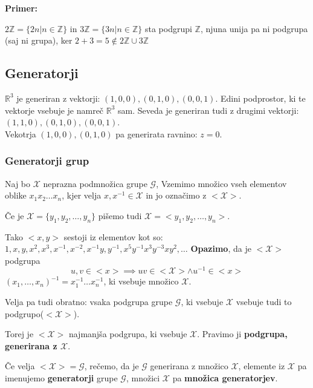 \documentclass[a4paper]{article}
\newcounter{environment:definition_counter}
\newcounter{environment:theorem_counter}
\newcounter{environment:statement_counter}
\newcounter{example:example_counter}
\newenvironment{example}
{\textbf{Primer:}\\}
{\setcounter{example:example_counter}{0}}
\newenvironment{example_case}
{\refstepcounter{example:example_counter} \arabic{example:example_counter}.}
{\\}
\begin{document}
\begin{example}
\begin{example_case}
$2\mathbb{Z} = \{2n | n \in \mathbb{Z}\}$ in $3\mathbb{Z} = \{3n | n \in \mathbb{Z}\}$ sta podgrupi $\mathbb{Z}$, njuna unija pa ni podgrupa (saj ni grupa), ker $2+3=5 \notin 2\mathbb{Z} \cup 3\mathbb{Z}$
\end{example_case}
\end{example}

\subsection{Generatorji}
$\mathbb{R}^3$ je generiran z vektorji: $(1,0,0), (0,1,0), (0,0,1)$. Edini podprostor, ki te vektorje vsebuje je namreč $\mathbb{R}^3$ sam. Seveda je generiran tudi z drugimi vektorji: $(1,1,0), (0,1,0), (0,0,1)$.\\
Vekotrja $(1,0,0),(0,1,0)$ pa generirata ravnino: $z=0$.

\subsubsection{Generatorji grup}
Naj bo $\mathcal{X}$ neprazna podmnožica grupe $\mathcal{G}$, Vzemimo množico vseh elementov oblike $x_1 x_2 \dots x_n$, kjer velja $x, x^{-1} \in \mathcal{X}$ in jo označimo z $<\mathcal{X}>$.
 
Če je $\mathcal{X} = \{y_1, y_2, \dots , y_n\}$ pišemo tudi $\mathcal{X} = <y_1, y_2, \dots , y_n>$. 

Tako $<x,y>$ sestoji iz elementov kot so: $1, x, y, x^2, x^3, x^{-1}, x^{-2}, x^{-1}y, y^{-1}, x^5y^{-1}x^3y^{-3}xy^2, \dots$
\textbf{Opazimo}, da je $<\mathcal{X}>$ podgrupa
$$u,v \in <x> \implies uv \in <\mathcal{X}> \land u^{-1} \in <x>$$
$(x_1,\dots, x_n)^{-1} = x_{1}^{-1} \dots x_n^{-1}$, ki vsebuje množico $\mathcal{X}$.

Velja pa tudi obratno: vsaka podgrupa grupe $\mathcal{G}$, ki vsebuje $\mathcal{X}$ vsebuje tudi to podgrupo($<\mathcal{X}>$).

Torej je $<\mathcal{X}>$ najmanjša podgrupa, ki vsebuje $\mathcal{X}$. Pravimo ji \textbf{podgrupa, generirana z $\mathcal{X}$}.

Če velja $<\mathcal{X}> = \mathcal{G}$, rečemo, da je $\mathcal{G}$ generirana z množico $\mathcal{X}$, elemente iz $\mathcal{X}$ pa imenujemo \textbf{generatorji} grupe $\mathcal{G}$, množici $\mathcal{X}$ pa \textbf{množica generatorjev}.\\
\end{document}

